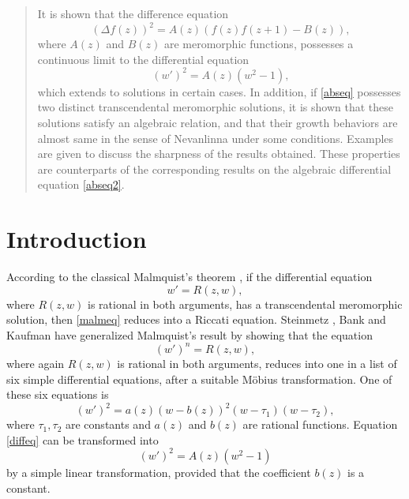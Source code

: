 \documentclass{amsart}
\begin{document}
\begin{abstract}
It is shown that the difference equation
\begin{equation}\label{abseq}
(\Delta f(z))^2=A(z)(f(z)f(z+1)-B(z)),
\end{equation}
where $A(z)$ and $B(z)$ are meromorphic functions, possesses a continuous limit to the differential equation
    \begin{equation}\label{abseq2}
    (w')^2=A(z)(w^2-1),
    \end{equation}
which extends to solutions in certain cases. In addition, if \eqref{abseq} possesses two distinct transcendental meromorphic solutions, it is shown that these solutions satisfy an algebraic relation, and that their growth behaviors are almost same in the sense of Nevanlinna under some conditions. Examples are given to discuss the sharpness of the results obtained. These properties are counterparts of the corresponding results on the algebraic differential equation \eqref{abseq2}.
\end{abstract}



\section{Introduction}
According to the classical Malmquist's theorem \cite{malmquist:13}, if the differential equation
    \begin{equation}\label{malmeq}
    w'=R(z,w),
    \end{equation}
where $R(z,w)$ is rational in both arguments, has a transcendental meromorphic solution, then \eqref{malmeq} reduces into a Riccati equation. Steinmetz \cite{steinmetz:78}, Bank and Kaufman \cite{bankk:80} have generalized Malmquist's result by showing that the equation
    \begin{equation}\label{malmeq2}
    (w')^n=R(z,w),
    \end{equation}
where again $R(z,w)$ is rational in both arguments, reduces into one in a list of six simple differential equations, after a suitable M\"obius transformation. One of these six equations is
    \begin{equation}\label{diffeq}
    (w')^2 = a(z)(w-b(z))^2(w-\tau_1)(w-\tau_2),
    \end{equation}
where $\tau_1,\tau_2$ are constants and $a(z)$ and $b(z)$ are rational functions. Equation \eqref{diffeq} can be transformed into
    \begin{equation}
    (w')^2=A(z)(w^2-1)\label{1.5}
    \end{equation}
by a simple linear transformation, provided that the coefficient $b(z)$ is a constant.
\end{document}
